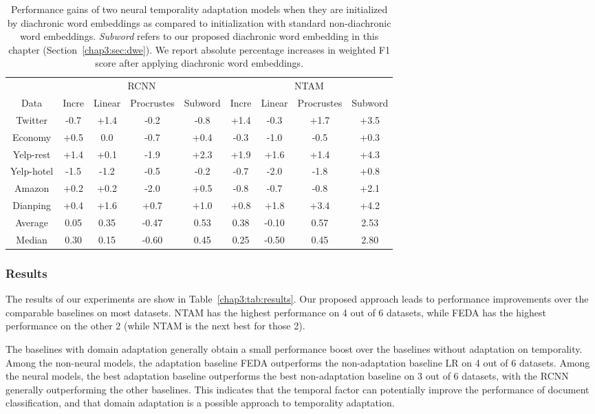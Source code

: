 \begin{table}[t]
\centering
\begin{tabular}{c||cccc||cccc}
 & \multicolumn{4}{c||}{RCNN} & \multicolumn{4}{c}{NTAM} \\
Data & Incre & Linear & Procrustes & Subword & Incre & Linear & Procrustes & Subword\\\hline\hline
Twitter & -0.7 & +1.4 & -0.2 & -0.8 & +1.4 & -0.3 & +1.7 & +3.5\\
Economy & +0.5 & 0.0 & -0.7 & +0.4 & -0.3 & -1.0 & -0.5 & +0.3\\
Yelp-rest & +1.4 & +0.1 & -1.9 & +2.3 & +1.9 & +1.6 & +1.4 & +4.3\\
Yelp-hotel & -1.5 & -1.2 & -0.5 & -0.2 & -0.7 & -2.0 & -1.8 & +0.8\\
Amazon & +0.2 & +0.2 & -2.0 & +0.5 & -0.8 & -0.7 & -0.8 & +2.1\\
Dianping & +0.4 & +1.6 & +0.7 & +1.0 & +0.8 & +1.8 & +3.4 & +4.2\\\hline\hline
Average & 0.05 & 0.35 & -0.47 & 0.53 & 0.38 & -0.10 & 0.57 & 2.53\\
Median & 0.30 & 0.15 & -0.60 & 0.45 & 0.25 & -0.50 & 0.45 & 2.80\\
\end{tabular}
\caption{Performance gains of two neural temporality adaptation models when they are initialized by diachronic word embeddings as compared to initialization with standard non-diachronic word embeddings. \textit{Subword} refers to our proposed diachronic word embedding in this chapter (Section~\ref{chap3:sec:dwe}). We report absolute percentage increases in weighted F1 score after applying diachronic word embeddings.}
\label{chap3:tab:dia}
\end{table}


\subsubsection{Results}
\label{chap3:sec:results}


The results of our experiments are show in Table~\ref{chap3:tab:results}. 
Our proposed approach leads to performance improvements over the comparable baselines on most datasets.
NTAM has the highest performance on 4 out of 6 datasets, while FEDA has the highest performance on the other 2 (while NTAM is the next best for those 2).


The baselines with domain adaptation generally obtain a small performance boost over the baselines without adaptation on temporality. 
Among the non-neural models, the adaptation baseline FEDA outperforms the non-adaptation baseline LR on 4 out of 6 datasets. 
Among the neural models, the best adaptation baseline outperforms the best non-adaptation baseline on 3 out of 6 datasets,
with the RCNN generally outperforming the other baselines.
This indicates that the temporal factor can potentially improve the performance of document classification, and that domain adaptation is a possible approach to temporality adaptation. 

